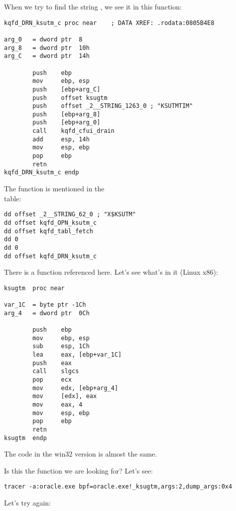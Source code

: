 When we try to find the string , we see it in this function:

\begin{lstlisting}[style=customasmx86]
kqfd_DRN_ksutm_c proc near    ; DATA XREF: .rodata:0805B4E8

arg_0   = dword ptr  8
arg_8   = dword ptr  10h
arg_C   = dword ptr  14h

        push    ebp
        mov     ebp, esp
        push    [ebp+arg_C]
        push    offset ksugtm
        push    offset _2__STRING_1263_0 ; "KSUTMTIM"
        push    [ebp+arg_8]
        push    [ebp+arg_0]
        call    kqfd_cfui_drain
        add     esp, 14h
        mov     esp, ebp
        pop     ebp
        retn
kqfd_DRN_ksutm_c endp
\end{lstlisting}

The  function is mentioned in the \\
 table:

\begin{lstlisting}[style=customasmx86]
dd offset _2__STRING_62_0 ; "X$KSUTM"
dd offset kqfd_OPN_ksutm_c
dd offset kqfd_tabl_fetch
dd 0
dd 0
dd offset kqfd_DRN_ksutm_c
\end{lstlisting}

There is a function  referenced here.
Let's see what's in it (Linux x86):

\begin{lstlisting}[caption=ksu.o,style=customasmx86]
ksugtm  proc near

var_1C  = byte ptr -1Ch
arg_4   = dword ptr  0Ch

        push    ebp
        mov     ebp, esp
        sub     esp, 1Ch
        lea     eax, [ebp+var_1C]
        push    eax
        call    slgcs
        pop     ecx
        mov     edx, [ebp+arg_4]
        mov     [edx], eax
        mov     eax, 4
        mov     esp, ebp
        pop     ebp
        retn
ksugtm  endp
\end{lstlisting}

The code in the win32 version is almost the same.

Is this the function we are looking for? Let's see:

\begin{lstlisting}
tracer -a:oracle.exe bpf=oracle.exe!_ksugtm,args:2,dump_args:0x4
\end{lstlisting}

Let's try again:

